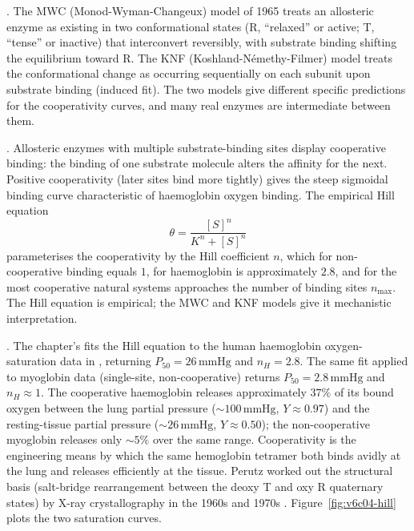 . The MWC (Monod-Wyman-Changeux) model
of 1965 \cite{paper:v6c04-monod-wyman-changeux-1965} treats an
allosteric enzyme as existing in two conformational states (R,
``relaxed'' or active; T, ``tense'' or inactive) that interconvert
reversibly, with substrate binding shifting the equilibrium toward R.
The KNF (Koshland-N\'emethy-Filmer) model
\cite{paper:v6c04-koshland-1966} treats the conformational change as
occurring sequentially on each subunit upon substrate binding (induced
fit). The two models give different specific predictions for the
cooperativity curves, and many real enzymes are intermediate between
them.

. Allosteric enzymes
with multiple substrate-binding sites display cooperative binding:
the binding of one substrate molecule alters the affinity for the
next. Positive cooperativity (later sites bind more tightly) gives
the steep sigmoidal binding curve characteristic of haemoglobin
oxygen binding. The empirical Hill equation
\cite{paper:v6c04-hill-1910}
\[
\theta = \frac{[S]^n}{K^n + [S]^n}
\]
parameterises the cooperativity by the Hill coefficient $n$, which
for non-cooperative binding equals $1$, for haemoglobin is
approximately $2.8$, and for the most cooperative natural systems
approaches the number of binding sites $n_{\max}$. The Hill equation
is empirical; the MWC and KNF models give it mechanistic
interpretation.

. The
chapter's  fits the Hill equation to
the human haemoglobin oxygen-saturation data in
, returning
$P_{50} = 26\,\text{mmHg}$ and $n_H = 2.8$. The same fit applied to
myoglobin data (single-site, non-cooperative) returns
$P_{50} = 2.8\,\text{mmHg}$ and $n_H \approx 1$. The cooperative
haemoglobin releases approximately $37\%$ of its bound oxygen
between the lung partial pressure ($\sim 100\,\text{mmHg}$, $Y
\approx 0.97$) and the resting-tissue partial pressure
($\sim 26\,\text{mmHg}$, $Y \approx 0.50$); the non-cooperative
myoglobin releases only $\sim 5\%$ over the same range. Cooperativity
is the engineering means by which the same hemoglobin tetramer
both binds avidly at the lung and releases efficiently at the tissue.
Perutz worked out the structural basis (salt-bridge rearrangement
between the deoxy T and oxy R quaternary states) by X-ray
crystallography in the 1960s and 1970s \cite{paper:v6c04-perutz-1970}.
Figure~\ref{fig:v6c04-hill} plots the two saturation curves.

